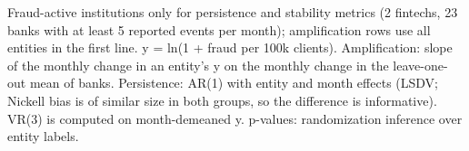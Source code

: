 \begin{table}[!htbp]\centering
\small
\caption{Dimensions of fraud resilience: amplification, persistence and stability}
\label{tab:res}
\par\vspace{2pt}\parbox{\textwidth}{\footnotesize Fraud-active institutions only for persistence and stability metrics (2 fintechs, 23 banks with at least 5 reported events per month); amplification rows use all entities in the first line. y = ln(1 + fraud per 100k clients). Amplification: slope of the monthly change in an entity's y on the monthly change in the leave-one-out mean of banks. Persistence: AR(1) with entity and month effects (LSDV; Nickell bias is of similar size in both groups, so the difference is informative). VR(3) is computed on month-demeaned y. p-values: randomization inference over entity labels.}
\end{table}